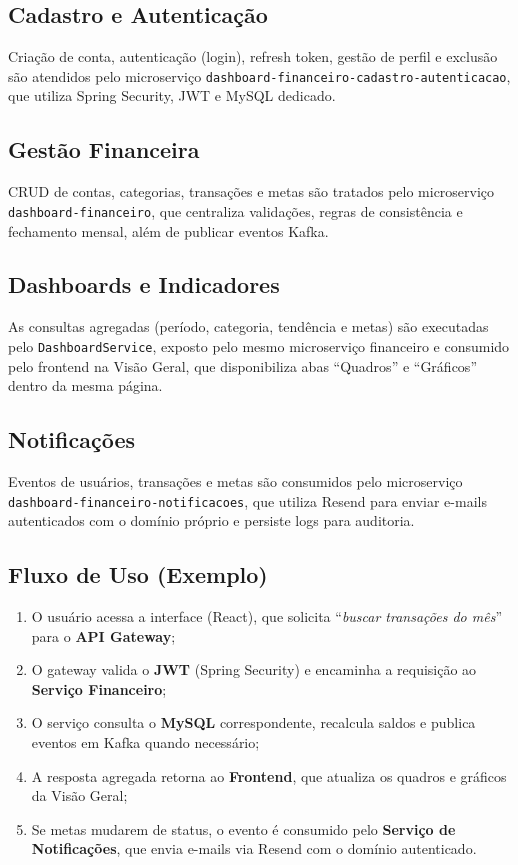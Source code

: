 \subsection{Cadastro e Autenticação}
Criação de conta, autenticação (login), refresh token, gestão de perfil e exclusão são atendidos pelo microserviço \texttt{dashboard-\allowbreak financeiro-\allowbreak cadastro-\allowbreak autenticacao}, que utiliza Spring Security, JWT e MySQL dedicado.

\subsection{Gestão Financeira}
CRUD de contas, categorias, transações e metas são tratados pelo microserviço \texttt{dashboard-\allowbreak financeiro}, que centraliza validações, regras de consistência e fechamento mensal, além de publicar eventos Kafka.

\subsection{Dashboards e Indicadores}
As consultas agregadas (período, categoria, tendência e metas) são executadas pelo \texttt{DashboardService}, exposto pelo mesmo microserviço financeiro e consumido pelo frontend na Visão Geral, que disponibiliza abas ``Quadros'' e ``Gráficos'' dentro da mesma página.

\subsection{Notificações}
Eventos de usuários, transações e metas são consumidos pelo microserviço \texttt{dashboard-\allowbreak financeiro-\allowbreak notificacoes}, que utiliza Resend para enviar e\hyp mails autenticados com o domínio próprio e persiste logs para auditoria.

\subsection{Fluxo de Uso (Exemplo)}

\begin{enumerate}
    \item O usuário acessa a interface (React), que solicita ``\textit{buscar transações do mês}'' para o \textbf{API Gateway};
    \item O gateway valida o \textbf{JWT} (Spring Security) e encaminha a requisição ao \textbf{Serviço Financeiro};
    \item O serviço consulta o \textbf{MySQL} correspondente, recalcula saldos e publica eventos em Kafka quando necessário;
    \item A resposta agregada retorna ao \textbf{Frontend}, que atualiza os quadros e gráficos da Visão Geral;
    \item Se metas mudarem de status, o evento é consumido pelo \textbf{Serviço de Notificações}, que envia e\hyp mails via Resend com o domínio autenticado.
\end{enumerate}

